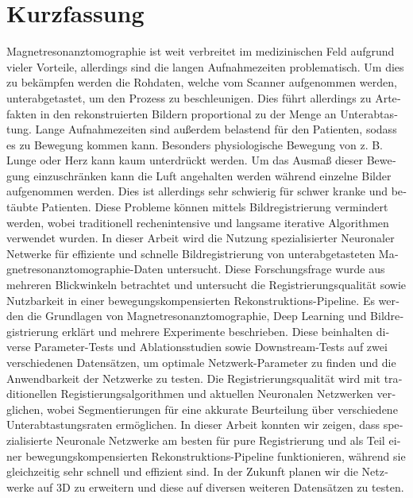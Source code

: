 \chapter*{Kurzfassung}
\begin{otherlanguage}{ngerman}
Magnetresonanztomographie ist weit verbreitet im medizinischen Feld aufgrund vieler Vorteile, allerdings sind die langen Aufnahmezeiten problematisch. Um dies zu bekämpfen werden die Rohdaten, welche vom Scanner aufgenommen werden, unterabgetastet, um den Prozess zu beschleunigen. Dies führt allerdings zu Artefakten in den rekonstruierten Bildern proportional zu der Menge an Unterabtastung. Lange Aufnahmezeiten sind außerdem belastend für den Patienten, sodass es zu Bewegung kommen kann. Besonders physiologische Bewegung von z. B. Lunge oder Herz kann kaum unterdrückt werden. Um das Ausmaß dieser Bewegung einzuschränken kann die Luft angehalten werden während einzelne Bilder aufgenommen werden. Dies ist allerdings sehr schwierig für schwer kranke und betäubte Patienten. Diese Probleme können mittels Bildregistrierung vermindert werden, wobei traditionell rechenintensive und langsame iterative Algorithmen verwendet wurden. In dieser Arbeit wird die Nutzung spezialisierter Neuronaler Netwerke für effiziente und schnelle Bildregistrierung von unterabgetasteten Magnetresonanztomographie-Daten untersucht. Diese Forschungsfrage wurde aus mehreren Blickwinkeln betrachtet und untersucht die Registrierungsqualität sowie Nutzbarkeit in einer bewegungskompensierten Rekonstruktions-Pipeline. Es werden die Grundlagen von Magnetresonanztomographie, Deep Learning und Bildregistrierung erklärt und mehrere Experimente beschrieben. Diese beinhalten diverse Parameter-Tests und Ablationsstudien sowie Downstream-Tests auf zwei verschiedenen Datensätzen, um optimale Netzwerk-Parameter zu finden und die Anwendbarkeit der Netzwerke zu testen. Die Registrierungsqualität wird mit traditionellen Registierungsalgorithmen und aktuellen Neuronalen Netzwerken verglichen,  wobei Segmentierungen für eine akkurate Beurteilung über verschiedene Unterabtastungsraten ermöglichen. In dieser Arbeit konnten wir zeigen, dass spezialisierte Neuronale Netzwerke am besten für pure Registrierung und als Teil einer bewegungskompensierten Rekonstruktions-Pipeline funktionieren, während sie gleichzeitig sehr schnell und effizient sind. In der Zukunft planen wir die Netzwerke auf 3D zu erweitern und diese auf diversen weiteren Datensätzen zu testen.
\end{otherlanguage}
